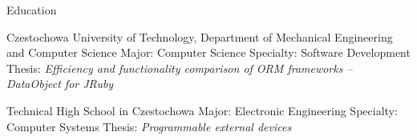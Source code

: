 
\begin{rubric}{Education}


\entry*[2005--2010]
  Czestochowa University of Technology, Department of Mechanical Engineering and Computer Science
\entry* Major: Computer Science
\entry* Specialty: Software Development
\entry* Thesis: \emph{Efficiency and functionality comparison of ORM frameworks -- DataObject for JRuby}

\entry*[1999--2004]
  Technical High School in Czestochowa
\entry* Major: Electronic Engineering
\entry* Specialty: Computer Systems
\entry* Thesis: \emph{Programmable external devices}

% 

\end{rubric}

